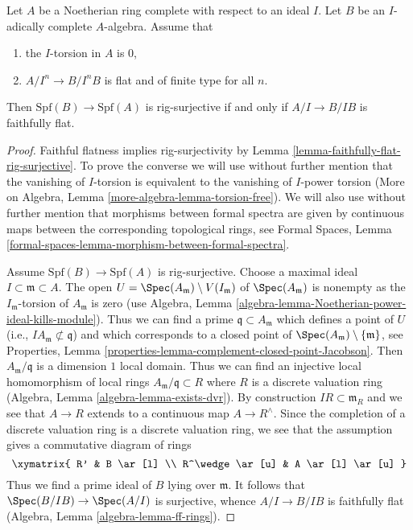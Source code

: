 \begin{lemma}
\label{lemma-flat-rig-surjective}
Let $A$ be a Noetherian ring complete with respect to an ideal $I$.
Let $B$ be an $I$-adically complete $A$-algebra. Assume that
\begin{enumerate}
\item the $I$-torsion in $A$ is $0$,
\item $A/I^n \to B/I^nB$ is flat and of finite type for all $n$.
\end{enumerate}
Then $\text{Spf}(B) \to \text{Spf}(A)$ is rig-surjective if and only
if $A/I \to B/IB$ is faithfully flat.
\end{lemma}

\begin{proof}
Faithful flatness implies rig-surjectivity by
Lemma \ref{lemma-faithfully-flat-rig-surjective}.
To prove the converse we will use without further mention that the
vanishing of $I$-torsion is equivalent to the vanishing of $I$-power torsion
(More on Algebra, Lemma \ref{more-algebra-lemma-torsion-free}).
We will also use without further mention that morphisms between
formal spectra are given by continuous maps between the corresponding
topological rings, see
Formal Spaces, Lemma \ref{formal-spaces-lemma-morphism-between-formal-spectra}.

\medskip\noindent
Assume $\text{Spf}(B) \to \text{Spf}(A)$ is rig-surjective.
Choose a maximal ideal $I \subset \mathfrak m \subset A$.
The open $U = \Spec(A_\mathfrak m) \setminus V(I_\mathfrak m)$
of $\Spec(A_\mathfrak m)$ is nonempty as the $I_\mathfrak m$-torsion of
$A_\mathfrak m$ is zero
(use Algebra, Lemma \ref{algebra-lemma-Noetherian-power-ideal-kills-module}).
Thus we can find a prime $\mathfrak q \subset A_\mathfrak m$ which defines
a point of $U$ (i.e., $IA_\mathfrak m \not \subset \mathfrak q$)
and which corresponds to a closed point
of $\Spec(A_\mathfrak m) \setminus \{\mathfrak m\}$, see
Properties, Lemma \ref{properties-lemma-complement-closed-point-Jacobson}.
Then $A_\mathfrak m/\mathfrak q$ is a dimension $1$ local domain.
Thus we can find an injective local homomorphism of local rings
$A_\mathfrak m/\mathfrak q \subset R$ where $R$ is a discrete valuation ring
(Algebra, Lemma \ref{algebra-lemma-exists-dvr}).
By construction $IR \subset \mathfrak m_R$ and we see that
$A \to R$ extends to a continuous map $A \to R^\wedge$.
Since the completion of a discrete valuation ring is a discrete
valuation ring, we see that the assumption gives a commutative
diagram of rings
$$
\xymatrix{
R' & B \ar[l] \\
R^\wedge \ar[u] & A \ar[l] \ar[u]
}
$$
Thus we find a prime ideal of $B$ lying over $\mathfrak m$. It follows
that $\Spec(B/IB) \to \Spec(A/I)$ is surjective, whence $A/I \to B/IB$
is faithfully flat
(Algebra, Lemma \ref{algebra-lemma-ff-rings}).
\end{proof}

